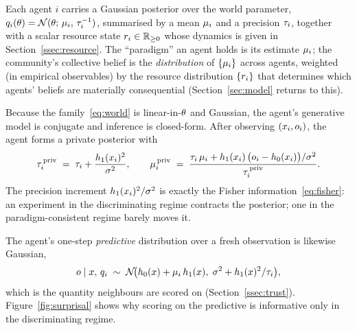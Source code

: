Each agent $i$ carries a Gaussian posterior over the world parameter,
$q_i(\theta) = \mathcal{N}(\theta;\, \mu_i,\, \tau_i^{-1})$,
summarised by a mean $\mu_i$ and a precision $\tau_i$, together
with a scalar resource state $r_{i} \in \mathbb{R}_{\geq 0}$ whose
dynamics is given in Section~\ref{ssec:resource}. The ``paradigm'' an
agent holds is its estimate $\mu_i$; the community's collective
belief is the \emph{distribution} of $\{\mu_i\}$ across agents,
weighted (in empirical observables) by the resource distribution
$\{r_{i}\}$ that determines which agents' beliefs are materially
consequential (Section~\ref{sec:model} returns to this).

Because the family~\eqref{eq:world} is linear-in-$\theta$ and
Gaussian, the agent's generative model is conjugate and inference is
closed-form. After observing $(x_i, o_i)$, the agent forms a
private posterior with
\begin{equation}
\tau_i^{\,\mathrm{priv}}
\;=\;
\tau_i + \frac{h_{1}(x_i)^{2}}{\sigma^{2}},
\qquad
\mu_i^{\,\mathrm{priv}}
\;=\;
\frac{\tau_i\,\mu_i
      + h_{1}(x_i)\,\bigl(o_i - h_{0}(x_i)\bigr)/\sigma^{2}}
     {\tau_i^{\,\mathrm{priv}}}.
\label{eq:private-update}
\end{equation}
The precision increment $h_{1}(x_i)^{2}/\sigma^{2}$ is exactly the
Fisher information~\eqref{eq:fisher}: an experiment in the
discriminating regime contracts the posterior; one in the
paradigm-consistent regime barely moves it.

The agent's one-step \emph{predictive} distribution over a fresh
observation is likewise Gaussian,
\begin{equation}
o \mid x,\, q_i
\;\sim\;
\mathcal{N}\!\bigl(h_{0}(x) + \mu_i\,h_{1}(x),\;
                   \sigma^{2} + h_{1}(x)^{2}/\tau_i\bigr),
\label{eq:predictive}
\end{equation}
which is the quantity neighbours are scored on
(Section~\ref{ssec:trust}). Figure~\ref{fig:surprisal} shows why
scoring on the predictive is informative only in the discriminating
regime.


